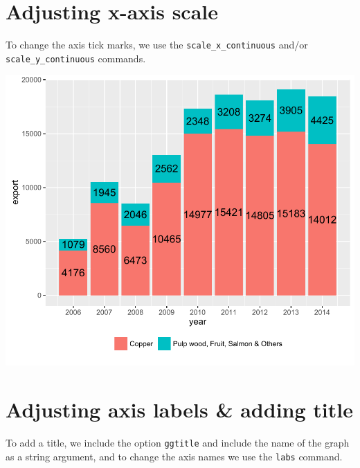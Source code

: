 \section{Adjusting x-axis scale}\label{adjusting-x-axis-scale}

To change the axis tick marks, we use the \texttt{scale\_x\_continuous}
and/or \texttt{scale\_y\_continuous} commands.

\begin{Shaded}
\begin{Highlighting}[]
\StringTok{ }\StringTok{ }\NormalTok{(}\NormalTok{(}\NormalTok{,}\NormalTok{,}\NormalTok{))}
\end{Highlighting}
\end{Shaded}

\begin{center}\includegraphics[width=0.6\linewidth]{3_Bar_Plots_pdf/bar_6-1} \end{center}

\section{Adjusting axis labels \& adding
title}\label{adjusting-axis-labels-adding-title}

To add a title, we include the option \texttt{ggtitle} and include the
name of the graph as a string argument, and to change the axis names we
use the \texttt{labs} command.

\begin{Shaded}
\begin{Highlighting}[]
\StringTok{ }\StringTok{ }\NormalTok{(}\NormalTok{) +}\StringTok{ }
  \NormalTok{(}\NormalTok{, }\NormalTok{) }
\end{Highlighting}
\end{Shaded}

